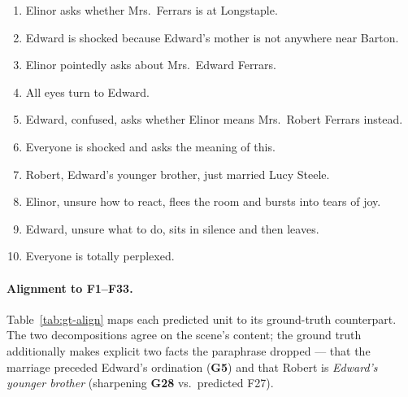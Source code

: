 \documentclass[11pt]{article}
\begin{document}
\begin{enumerate}[label=\textbf{G\arabic*.},leftmargin=*]
  \item Elinor asks whether Mrs.~Ferrars is at Longstaple.
  \item Edward is shocked because Edward's mother is not anywhere near Barton.
  \item Elinor pointedly asks about Mrs.~Edward Ferrars.
  \item All eyes turn to Edward.
  \item Edward, confused, asks whether Elinor means Mrs.~Robert Ferrars instead.
  \item Everyone is shocked and asks the meaning of this.
  \item Robert, Edward's younger brother, just married Lucy Steele.
  \item Elinor, unsure how to react, flees the room and bursts into tears of joy.
  \item Edward, unsure what to do, sits in silence and then leaves.
  \item Everyone is totally perplexed.
\end{enumerate}

\paragraph{Alignment to F1--F33.}
Table~\ref{tab:gt-align} maps each predicted unit to its ground-truth
counterpart. The two decompositions agree on the scene's content; the ground
truth additionally makes explicit two facts the paraphrase dropped --- that the
marriage preceded Edward's ordination (\textbf{G5}) and that Robert is
\emph{Edward's younger brother} (sharpening \textbf{G28} vs.\ predicted F27).
\end{document}
